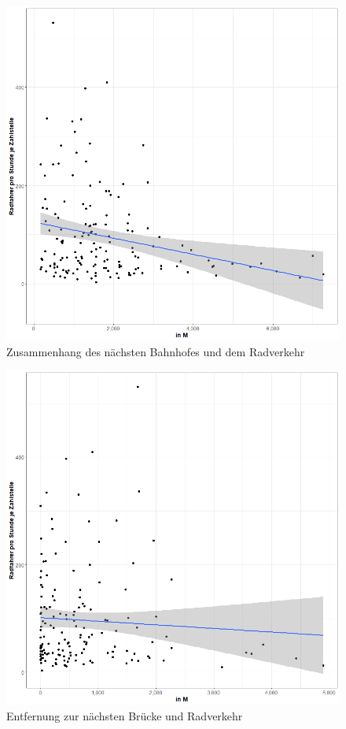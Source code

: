 \documentclass[a4paper,12pt]{thesis}
\begin{document}
\begin{figure}[!ht]
	\centering
	\includegraphics[width=\textwidth]{Plots/plot19.png}
	\caption{Zusammenhang des nächsten Bahnhofes und dem Radverkehr}
	\label{Train}
\end{figure}

\begin{figure}[!ht]
	\centering
	\includegraphics[width=\textwidth]{Plots/plot21.png}
	\caption{Entfernung zur nächsten Brücke und Radverkehr}
	\label{Bridge}
\end{figure}

\newpage
{}

\end{document}
